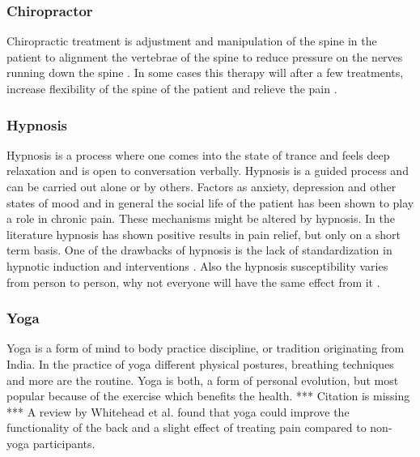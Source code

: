 \subsubsection{Chiropractor}
Chiropractic treatment is adjustment and manipulation of the spine in the patient to alignment the vertebrae of the spine to reduce pressure on the nerves running down the spine \cite{Gerald2013}. In some cases this therapy will after a few treatments, increase flexibility of the spine of the patient and relieve the pain \cite{Peterson2012}.

\subsubsection{Hypnosis}
Hypnosis is a process where one comes into the state of trance and feels deep relaxation and is open to conversation verbally. Hypnosis is a guided process and can be carried out alone or by others. \cite{Gerald2013} Factors as anxiety, depression and other states of mood and in general the social life of the patient has been shown to play a role in chronic pain. These mechanisms might be altered by hypnosis.
In the literature hypnosis has shown positive results in pain relief, but only on a short term basis. \cite{Dhanani2011}
One of the drawbacks of hypnosis is the lack of standardization in hypnotic induction and interventions \cite{Alkins2010}. Also the hypnosis susceptibility  varies from person to person, why not everyone will have the same effect from it \cite{Spiegel2013}.

\subsubsection{Yoga}
Yoga is a form of mind to body practice discipline, or tradition originating from India. In the practice of yoga different physical postures, breathing techniques and more are the routine. 
Yoga is both, a form of personal evolution, but most popular because of the exercise which benefits the health. *** Citation is missing ***
A review by Whitehead et al. \cite{Whitehead2017} found that yoga could improve the functionality of the back and a slight effect of treating pain compared to non-yoga participants. 


